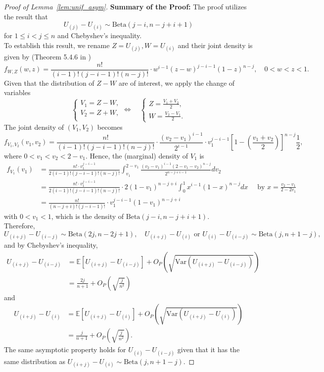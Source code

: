 \documentclass{uwstat572}
\theoremstyle{definition}
\theoremstyle{theorem}
\begin{document}
\begin{proof}[Proof of Lemma~\ref{lem:unif_asym}]
{\bf Summary of the Proof:} The proof utilizes the result that 
$$U_{(j)} - U_{(i)} \sim \mathrm{Beta}(j-i, n-j+i+1)$$
for $1\leq i < j\leq n$ and Chebyshev's inequality.\\

To establish this result, we rename $Z=U_{(j)}, W=U_{(i)}$ and their joint density is given by (Theorem 5.4.6 in \citealt{casella2002statistical})
$$f_{W,Z}(w,z) = \frac{n!}{(i-1)!(j-i-1)!(n-j)!} \cdot w^{i-1} (z-w)^{j-i-1} (1-z)^{n-j}, \quad 0< w<z<1.$$
Given that the distribution of $Z-W$ are of interest, we apply the change of variables
\[
\begin{cases}
V_1 = Z-W,\\
V_2 = Z+W,\\
\end{cases} \iff \quad
\begin{cases}
Z = \frac{V_1+V_2}{2},\\
W = \frac{V_2-V_1}{2}.
\end{cases}
\]
The joint density of $(V_1,V_2)$ becomes
$$f_{V_1,V_2}(v_1,v_2) = \frac{n!}{(i-1)!(j-i-1)!(n-j)!} \cdot \frac{(v_2-v_1)^{i-1}}{2^{i-1}}\cdot v_1^{j-i-1} \left[1-\left(\frac{v_1+v_2}{2}\right)\right]^{n-j} \frac{1}{2},$$
where $0<v_1<v_2<2-v_1$. Hence, the (marginal) density of $V_1$ is 
\begin{align*}
f_{V_1}(v_1) &=  \frac{n! \cdot v_1^{j-i-1}}{2(i-1)!(j-i-1)!(n-j)!} \int_{v_1}^{2-v_1} \frac{(v_2-v_1)^{i-1} (2-v_1-v_2)^{n-j}}{2^{n-j+i-1}} dv_2\\
&= \frac{n! \cdot v_1^{j-i-1}}{2(i-1)!(j-i-1)!(n-j)!} \cdot 2(1-v_1)^{n-j+i}\int_0^1 x^{i-1} (1-x)^{n-j} dx\quad \text{ by } x=\frac{v_2-v_1}{2-2v_1}\\
&= \frac{n!}{(n-j+i)!(j-i-1)!} \cdot v_1^{j-i-1} (1-v_1)^{n-j+i}
\end{align*}
with $0<v_1<1$, which is the density of $\mathrm{Beta}(j-i,n-j+i+1)$.\\
Therefore,
$$U_{(i+j)} - U_{(i-j)} \sim \mathrm{Beta}\left(2j, n-2j+1\right), \quad U_{(i+j)} - U_{(i)} \text{ or } U_{(i)} -U_{(i-j)}\sim \mathrm{Beta}\left(j,n+1-j \right),$$
and by Chebyshev's inequality,
\begin{align*}
U_{(i+j)} - U_{(i-j)} &= \mathbb{E}\left[U_{(i+j)} - U_{(i-j)} \right] + O_P\left(\sqrt{\mathrm{Var}\left(U_{(i+j)} - U_{(i-j)}\right)}\right)\\
&= \frac{2j}{n+1} + O_P\left(\sqrt{\frac{j}{n^2}}\right)
\end{align*}
and
\begin{align*}
U_{(i+j)} - U_{(i)} &= \mathbb{E}\left[U_{(i+j)} - U_{(i)}\right] + O_P\left(\sqrt{\mathrm{Var}\left(U_{(i+j)} - U_{(i)}\right)}\right)\\
&= \frac{j}{n+1} +O_P\left(\sqrt{\frac{j}{n^2}}\right).
\end{align*}
The same asymptotic property holds for $U_{(i)} - U_{(i-j)}$ given that it has the same distribution as $U_{(i+j)} - U_{(i)} \sim \mathrm{Beta}\left(j,n+1-j\right)$.
\end{proof}
\end{document}
